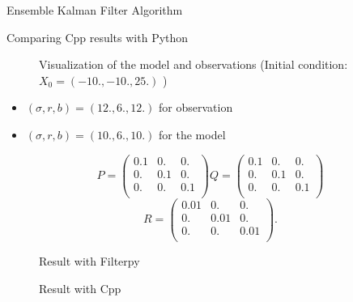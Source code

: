 \begin{frame}{Ensemble Kalman Filter Algorithm}
    \begin{figure}[H]
	\end{figure}
\end{frame}
\begin{frame}[allowframebreaks]{Comparing Cpp results with Python}
\begin{minipage}{0.4\hsize}
			\centering
	\begin{figure}[H]
		\caption{Visualization of the model and observations (Initial condition: $X_0=(-10.,-10.,25.) $ )}
	\end{figure}
		\end{minipage} \quad
		\begin{minipage}{0.5\hsize}
			\begin{itemize}
    \item $(\sigma, r, b)=(12.,6.,12.)$ for observation
    \item $(\sigma, r, b)=(10.,6.,10.)$ for the model
    \end{itemize}
    \newline
    \newline
     $$P=\begin{pmatrix}
            0.1 & 0. & 0. \\
            0. & 0.1 & 0. \\
            0. & 0. & 0.1 \\
            \end{pmatrix}
            Q=\begin{pmatrix}
            0.1 & 0. & 0. \\
            0. & 0.1 & 0. \\
            0. & 0. & 0.1 \\
            \end{pmatrix}$$
            \newline
            $$R=\begin{pmatrix}
            0.01 & 0. & 0. \\
            0. & 0.01 & 0. \\
            0. & 0. & 0.01 \\
            \end{pmatrix}.$$ 
    
		\end{minipage}
		
\newpage
\centering
	\begin{figure}[H]
		\caption{Result with Filterpy}
	\end{figure}

\newpage
\centering
	\begin{figure}[H]
		\caption{Result with Cpp}
	\end{figure}

\end{frame}
